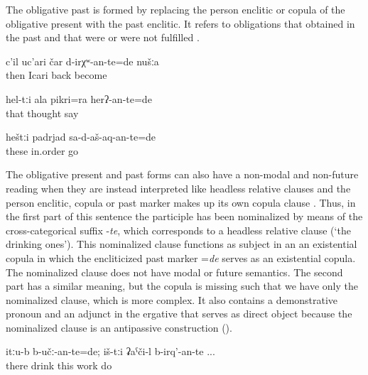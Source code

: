 The obligative past is formed by replacing the person enclitic or copula of the obligative present with the past enclitic. It refers to obligations that obtained in the past and that were or were not fulfilled .
%
\begin{exe}
	\ex	\label{ex:Then we had to be back in Icari analytic}
	\gll	c'il	uc'ari	čar	d-irχʷ-an-te=de	nušːa\\
		then	Icari	back	become	\\
	\glt	{}

	\ex	\label{ex:(You) should have told your thoughts analytic}
	\gll	hel-tːi	ala	pikri=ra	herʔ-an-te=de\\
		that		thought		say\\
	\glt	{}

	\ex	\label{ex:‎‎These (pictures) should have been come in the right order}
	\gll	heštːi	padrjad	sa-d-aš-aq-an-te=de\\
		these	in.order	go\\
	\glt	{}
\end{exe}

The obligative present and past forms can also have a non-modal and non-future reading when they are instead interpreted like headless relative clauses and the person enclitic, copula or past marker makes up its own copula clause . Thus, in the first part of this sentence the participle has been nominalized by means of the cross-categorical suffix -\textit{te}, which corresponds to a headless relative clause (`the drinking ones'). This nominalized clause functions as subject in an an existential copula in which the encliticized past marker =\textit{de} serves as an existential copula. The nominalized clause does not have modal or future semantics. The second part has a similar meaning, but the copula is missing such that we have only the nominalized clause, which is more complex. It also contains a demonstrative pronoun and an adjunct in the ergative that serves as direct object because the nominalized clause is an antipassive construction ().
%
\begin{exe}
	\ex	\label{ex:There were the drinking ones; these (are) the working ones}
	\gll	itːu-b	b-učː-an-te=de;	iš-tːi	ʡaˁči-l	b-irq'-an-te ...\\
		there	drink	this	work	do\\
	\glt	{}
\end{exe}



